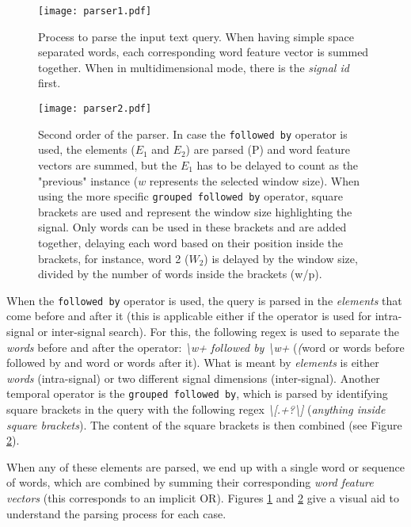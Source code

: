 \begin{figure}
\centering
\texttt{[image: parser1.pdf]}
\caption{Process to parse the input text query. When having simple space separated words, each corresponding word feature vector is summed together. When in multidimensional mode, there is the \textit{signal id} first.}
\label{fig:parser1}
\end{figure}

\begin{figure}
\centering
\texttt{[image: parser2.pdf]}
\caption{Second order of the parser. In case the \texttt{followed by} operator is used, the elements ($E_1$ and $E_2$) are parsed (P) and word feature vectors are summed, but the $E_1$ has to be delayed to count as the "previous" instance ($w$ represents the selected window size). When using the more specific \texttt{grouped followed by} operator, square brackets are used and represent the window size highlighting the signal. Only words can be used in these brackets and are added together, delaying each word based on their position inside the brackets, for instance, word 2 ($W_2$) is delayed by the window size, divided by the number of words inside the brackets (w/p).}
\label{fig:parser2}
\end{figure}

When the \texttt{followed by} operator is used, the query is parsed in the \textit{elements} that come before and after it (this is applicable either if the operator is used for intra-signal or inter-signal search). For this, the following \gls{regex} is used to separate the \textit{words} before and after the operator: \textit{\textbackslash w+ followed by \textbackslash w+} (\textit(word or words before followed by and word or words after it). What is meant by \textit{elements} is either \textit{words} (intra-signal) or two different signal dimensions (inter-signal). Another temporal operator is the \texttt{grouped followed by}, which is parsed by identifying square brackets in the query with the following \gls{regex} \textit{\textbackslash[.+?\textbackslash]} (\textit{anything inside square brackets}). The content of the square brackets is then combined (see Figure \ref{fig:parser2}).

When any of these elements are parsed, we end up with a single word or sequence of words, which are combined by summing their corresponding \textit{word feature vectors} (this corresponds to an implicit OR). Figures \ref{fig:parser1} and \ref{fig:parser2} give a visual aid to understand the parsing process for each case.

